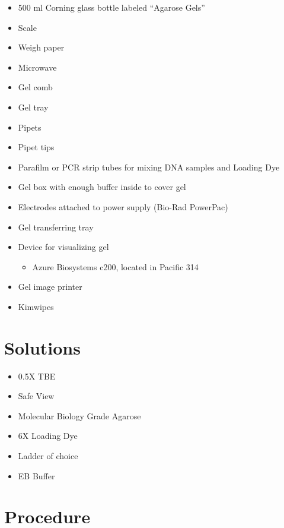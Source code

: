 \documentclass[
  letterpaper,
  DIV=11,
  numbers=noendperiod]{scrreprt}
\providecommand{\tightlist}{%
  \setlength{\itemsep}{0pt}\setlength{\parskip}{0pt}}\usepackage{longtable,booktabs,array}
\begin{document}
\begin{itemize}
\tightlist
\item
  500 ml Corning glass bottle labeled ``Agarose Gels''
\item
  Scale
\item
  Weigh paper
\item
  Microwave
\item
  Gel comb
\item
  Gel tray
\item
  Pipets
\item
  Pipet tips
\item
  Parafilm or PCR strip tubes for mixing DNA samples and Loading Dye
\item
  Gel box with enough buffer inside to cover gel
\item
  Electrodes attached to power supply (Bio-Rad PowerPac)
\item
  Gel transferring tray
\item
  Device for visualizing gel

  \begin{itemize}
  \tightlist
  \item
    Azure Biosystems c200, located in Pacific 314
  \end{itemize}
\item
  Gel image printer
\item
  Kimwipes
\end{itemize}

\hypertarget{solutions-16}{%
\section{Solutions}\label{solutions-16}}

\begin{itemize}
\tightlist
\item
  0.5X TBE
\item
  Safe View
\item
  Molecular Biology Grade Agarose
\item
  6X Loading Dye
\item
  Ladder of choice
\item
  EB Buffer
\end{itemize}

\hypertarget{procedure-16}{%
\section{Procedure}\label{procedure-16}}
\end{document}

